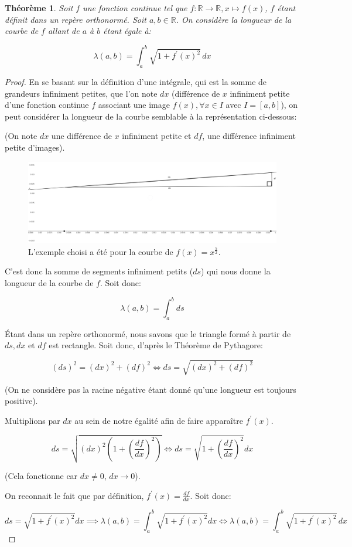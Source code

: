 \documentclass{amsart}
\newtheorem{theorem}{Théorème}[section]
\theoremstyle{definition}
\theoremstyle{remark}
\numberwithin{equation}{section}
\begin{document}
\begin{theorem}
  Soit $f$ une fonction continue tel que $f:\mathbb{R}\longrightarrow \mathbb{R}, x\longmapsto f(x)$, $f$ étant définit dans un repère orthonormé. Soit $a,b\in\mathbb{R}$. On considère la longueur de la courbe de $f$ allant de $a$ à $b$ étant égale à:

  \[\lambda(a,b)=\int_{a}^{b} \sqrt{1+{f^\prime}(x)^2} \,dx\]
\end{theorem}

\begin{proof}
  En se basant sur la définition d'une intégrale, qui est la somme de grandeurs infiniment petites, que l'on note $dx$ (différence de $x$ infiniment petite d'une fonction continue $f$ associant une image $f(x), \forall x\in I$ avec $I=[a,b]$), on peut considérer la longueur de la courbe semblable à la représentation ci-dessous: 
  
  (On note $dx$ une différence de $x$ infiniment petite et $df$, une différence infiniment petite d'images).

  \begin{figure}[H]
    \centering
    \includegraphics[scale=0.2]{images/curve.png}
    \caption{L'exemple choisi a été pour la courbe de $f(x)=x^{\frac{5}{2}}$.}
  \end{figure}

  C'est donc la somme de segments infiniment petits ($ds$) qui nous donne la longueur de la courbe de $f$. Soit donc:

  \[\lambda(a,b)=\int_{a}^{b}ds\]

  Étant dans un repère orthonormé, nous savons que le triangle formé à partir de $ds, dx$ et $df$ est rectangle. Soit donc, d'après le Théorème de Pythagore:

  \[(ds)^2=(dx)^2+(df)^2 \Leftrightarrow ds=\sqrt{(dx)^2+(df)^2}\]

  (On ne considère pas la racine négative étant donné qu'une longueur est toujours positive).

  Multiplions par $dx$ au sein de notre égalité afin de faire apparaître $f^\prime(x)$.

  \[ds = \sqrt{(dx)^2(1+(\frac{df}{dx})^2)} \Leftrightarrow ds = \sqrt{1+(\frac{df}{dx})^2}dx\]

  (Cela fonctionne car $dx\ne0$, $dx\to 0$).

  On reconnait le fait que par définition, $f^\prime(x)=\frac{df}{dx}$. Soit donc: 

  \[ds=\sqrt{1+{f^\prime}(x)^2}dx \implies \lambda(a,b)=\int_{a}^{b}\sqrt{1+{f^\prime}(x)^2}dx \Leftrightarrow \lambda(a,b)=\int_{a}^{b}\sqrt{1+{f^\prime}(x)^2}\,dx\]
\end{proof}
\end{document}

